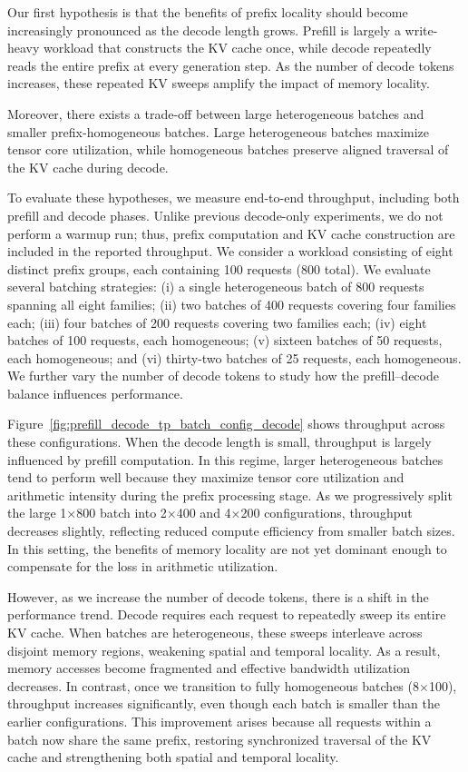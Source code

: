 Our first hypothesis is that the benefits of prefix locality should become increasingly pronounced as the decode length grows. Prefill is largely a write-heavy workload that constructs the KV cache once, while decode repeatedly reads the entire prefix at every generation step. As the number of decode tokens increases, these repeated KV sweeps amplify the impact of memory locality.

Moreover, there exists a trade-off between large heterogeneous batches and smaller prefix-homogeneous batches. Large heterogeneous batches maximize tensor core utilization, while homogeneous batches preserve aligned traversal of the KV cache during decode.

To evaluate these hypotheses, we measure end-to-end throughput, including both prefill and decode phases. Unlike previous decode-only experiments, we do not perform a warmup run; thus, prefix computation and KV cache construction are included in the reported throughput. We consider a workload consisting of eight distinct prefix groups, each containing 100 requests (800 total). We evaluate several batching strategies: (i) a single heterogeneous batch of 800 requests spanning all eight families; (ii) two batches of 400 requests covering four families each; (iii) four batches of 200 requests covering two families each; (iv) eight batches of 100 requests, each homogeneous; (v) sixteen batches of 50 requests, each homogeneous; and (vi) thirty-two batches of 25 requests, each homogeneous. We further vary the number of decode tokens to study how the prefill–decode balance influences performance.

Figure~\ref{fig:prefill_decode_tp_batch_config_decode} shows throughput across these configurations. When the decode length is small, throughput is largely influenced by prefill computation. In this regime, larger heterogeneous batches tend to perform well because they maximize tensor core utilization and arithmetic intensity during the prefix processing stage. As we progressively split the large 1×800 batch into 2×400 and 4×200 configurations, throughput decreases slightly, reflecting reduced compute efficiency from smaller batch sizes. In this setting, the benefits of memory locality are not yet dominant enough to compensate for the loss in arithmetic utilization.

However, as we increase the number of decode tokens, there is a shift in the performance trend. Decode requires each request to repeatedly sweep its entire KV cache. When batches are heterogeneous, these sweeps interleave across disjoint memory regions, weakening spatial and temporal locality. As a result, memory accesses become fragmented and effective bandwidth utilization decreases. In contrast, once we transition to fully homogeneous batches (8$\times$100), throughput increases significantly, even though each batch is smaller than the earlier configurations. This improvement arises because all requests within a batch now share the same prefix, restoring synchronized traversal of the KV cache and strengthening both spatial and temporal locality.

